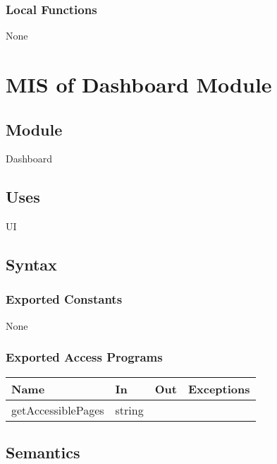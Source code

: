 \documentclass[12pt, titlepage]{article}
\begin{document}
\subsubsection{Local Functions}

None

\newpage

\section{MIS of Dashboard Module} \label{mDashboard} 



\subsection{Module}

Dashboard

\subsection{Uses}
UI

\subsection{Syntax}

\subsubsection{Exported Constants}
None
\subsubsection{Exported Access Programs}

\begin{center}
\begin{tabular}{p{4cm} p{3cm} p{3cm} p{2cm}}
\hline
\textbf{Name} & \textbf{In} & \textbf{Out} & \textbf{Exceptions} \\
\hline
getAccessiblePages & string &  &  \\
\hline
\end{tabular}
\end{center}

\subsection{Semantics}
\end{document}
